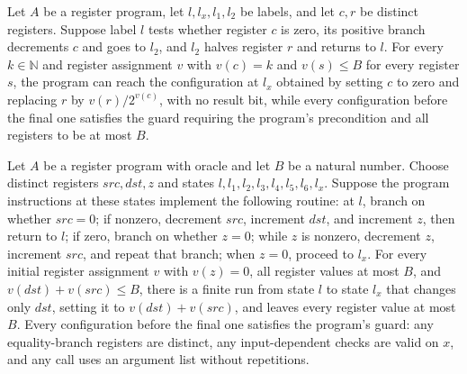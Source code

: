 \begin{theorem}
\label{Complexity.LogProg.halve_run}
\leanok
{}
Let $A$ be a register program, let $l,l_x,l_1,l_2$ be labels, and let $c,r$ be distinct
registers. Suppose label $l$ tests whether register $c$ is zero, its positive branch
decrements $c$ and goes to $l_2$, and $l_2$ halves register $r$ and returns to $l$. For
every $k\in\mathbb N$ and register assignment $v$ with $v(c)=k$ and $v(s)\le B$ for
every register $s$, the program can reach the configuration at $l_x$ obtained by setting
$c$ to zero and replacing $r$ by $v(r)/2^{v(c)}$, with no result bit, while every
configuration before the final one satisfies the guard requiring the program's
precondition and all registers to be at most $B$.
\end{theorem}

\begin{theorem}
\label{Complexity.LogProg.copy_run}
\leanok
{}
Let $A$ be a register program with oracle and let $B$ be a natural number. Choose
distinct registers $src,dst,z$ and states $l,l_1,l_2,l_3,l_4,l_5,l_6,l_x$. Suppose the
program instructions at these states implement the following routine: at $l$, branch on
whether $src=0$; if nonzero, decrement $src$, increment $dst$, and increment $z$, then
return to $l$; if zero, branch on whether $z=0$; while $z$ is nonzero, decrement $z$,
increment $src$, and repeat that branch; when $z=0$, proceed to $l_x$. For every initial
register assignment $v$ with $v(z)=0$, all register values at most $B$, and
$v(dst)+v(src)\le B$, there is a finite run from state $l$ to state $l_x$ that changes
only $dst$, setting it to $v(dst)+v(src)$, and leaves every register value at most $B$.
Every configuration before the final one satisfies the program's guard: any
equality-branch registers are distinct, any input-dependent checks are valid on $x$, and
any call uses an argument list without repetitions.
\end{theorem}

